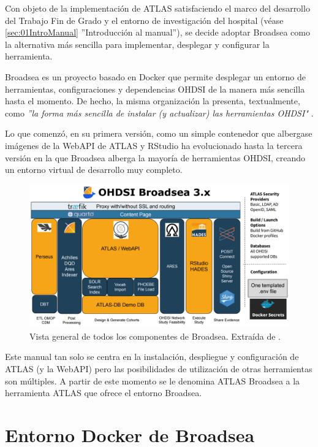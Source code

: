 Con objeto de la implementación de ATLAS satisfaciendo el marco del desarrollo del Trabajo Fin de Grado y el entorno de investigación del hospital (véase \ref{sec:01IntroManual} ''Introducción al manual''), se decide adoptar Broadsea como la alternativa más sencilla para implementar, desplegar y configurar la herramienta.

Broadsea es un proyecto basado en Docker que permite desplegar un entorno de herramientas, configuraciones y dependencias OHDSI de la manera más sencilla hasta el momento. De hecho, la misma organización la presenta, textualmente, como \textit{''la forma más sencilla de instalar (y actualizar) las herramientas OHDSI"} \parencite{Broadsea3PDF}. 

Lo que comenzó, en su primera versión, como un simple contenedor que albergase imágenes de la WebAPI de ATLAS y RStudio \parencite{Broadsea3PPTX} ha evolucionado hasta la tercera versión en la que Broadsea alberga la mayoría de herramientas OHDSI, creando un entorno virtual de desarrollo muy completo.

\begin{figure}[H]
    \centering
    \includegraphics[width=1\textwidth]{figures/OHDSIBroadsea3.0.png}
    \caption{Vista general de todos los componentes de Broadsea. Extraída de \parencite{Broadsea3PPTX}.}
    \label{fig:OHDSIBroadsea3.0}
\end{figure}

Este manual tan solo se centra en la instalación, despliegue y configuración de ATLAS (y la WebAPI) pero las posibilidades de utilización de otras herramientas son múltiples. A partir de este momento se le denomina ATLAS Broadsea a la herramienta ATLAS que ofrece el entorno Broadsea.


\section{Entorno Docker de Broadsea} \label{sec:01Docker}

